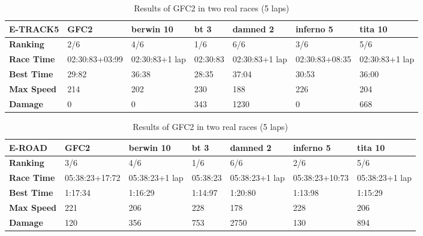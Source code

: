 \documentclass[sigconf]{acmart}
\begin{document}
\begin{table}[!ht]
	\centering
	{\scriptsize
		\caption{Results of GFC2 in two real races (5 laps)}
		\label{tab:gfc2real}
		\begin{tabular}{|p{2 cm}|p{1.5 cm}|p{1.5 cm}|p{1.5 cm}|p{1.5 cm}|p{1.5 cm}|p{1.5 cm}|}
			\hline \textbf{E-TRACK5} & \textbf{GFC2}&\textbf{berwin 10} & \textbf{bt 3} &\textbf{damned 2} & \textbf{inferno 5} & \textbf{tita 10}  \\
			\hline \textbf{Ranking} & 2/6&4/6&1/6&6/6&3/6&5/6\\			
			\hline \textbf{Race Time}	& 02:30:83\newline +03:99&  02:30:83\newline+1 lap&02:30:83&02:30:83\newline+1 lap&02:30:83\newline+08:35&02:30:83\newline+1 lap\\	
			\hline \textbf{Best Time}& 29:82 &36:38&28:35&37:04&30:53&36:00\\	
			\hline \textbf{Max Speed}& 214&202&230&188&226&204\\	
			\hline \textbf{Damage}& 0& 0 & 343&1230&0&668\\	
			\hline 
		\end{tabular}
		
		\begin{tabular}{|p{2 cm}|p{1.5 cm}|p{1.5 cm}|p{1.5 cm}|p{1.5 cm}|p{1.5 cm}|p{1.5 cm}|}
			\hline \textbf{E-ROAD} & \textbf{GFC2}&\textbf{berwin 10} & \textbf{bt 3} &\textbf{damned 2} & \textbf{inferno 5} & \textbf{tita 10}  \\
			\hline \textbf{Ranking} & 3/6&4/6&1/6&6/6&2/6&5/6\\			
			\hline \textbf{Race Time}	& 05:38:23\newline +17:72&  05:38:23\newline+1 lap&05:38:23&05:38:23\newline+1 lap&05:38:23\newline+10:73&05:38:23\newline+1 lap\\	
			\hline \textbf{Best Time}& 1:17:34 &1:16:29&1:14:97&1:20:80&1:13:98&1:15:29\\	
			\hline \textbf{Max Speed}& 221&206&228&178&228&206\\
			\hline \textbf{Damage}& 120& 356 & 753&2750&130&894\\	
			\hline 
		\end{tabular}
	}
\end{table}
\end{document}
